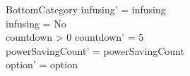 \begin{schema}{BottomCategory}
	infusing' = infusing\\
	infusing = No\\
	countdown > 0 \land countdown' = 5\\
	powerSavingCount' = powerSavingCount\\ option' = option\\
\end{schema}

